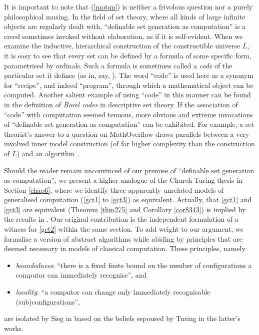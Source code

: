 \documentclass[12pt, twoside]{memoir}
\numberwithin{equation}{section}
\theoremstyle{definition}
\theoremstyle{remark}
\theoremstyle{definition}
\theoremstyle{definition}
\theoremstyle{definition}
\theoremstyle{remark}
\begin{document}
It is important to note that (\ref{motqn}) is neither a frivolous question nor a purely philosophical musing. In the field of set theory, where all kinds of large infinite objects are regularly dealt with, ``definable set generation as computation'' is a creed sometimes invoked without elaboration, as if it is self-evident. When we examine the inductive, hierarchical construction of the constructible universe $L$, it is easy to see that every set can be defined by a formula of some specific form, parametrised by ordinals. Such a formula is sometimes called a \textit{code} of the particular set it defines (as in, say, \cite{koepke1}). The word ``code'' is used here as a synonym for ``recipe'', and indeed ``program'', through which a mathematical object can be computed. Another salient example of using ``code'' in this manner can be found in the definition of \textit{Borel codes} in descriptive set theory. If the association of ``code'' with computation seemed tenuous, more obvious and extreme invocations of ``definable set generation as computation'' can be exhibited. For example, a set theorist's answer to a question on MathOverflow draws parallels between a very involved inner model construction (of far higher complexity than the construction of $L$) and an algorithm \cite{grigor}.

Should the reader remain unconvinced of our premise of ``definable set generation as computation'', we present a higher analogue of the Church-Turing thesis in Section \ref{chap6}, where we identify three apparently unrelated models of generalised computation (\ref{gct1} to \ref{gct3}) as equivalent. Actually, that \ref{gct1} and \ref{gct3} are equivalent (Theorem \ref{thm275} and Corollary \ref{cor8343}) is implied by the results in \cite{koepke1}. Our original contribution is the independent formulation of a witness for \ref{gct2} within the same section. To add weight to our argument, we formalise a version of abstract algorithms while abiding by principles that are deemed necessary in models of classical computation. These principles, namely
\begin{itemize}
    \item \textit{boundedness}: ``there is a fixed finite bound on the number of configurations a computor can immediately recognise'', and
    \item \textit{locality}: ``a computor can change only immediately recognisable (sub)configurations'',
\end{itemize}
are isolated by Sieg in \cite{sieg} based on the beliefs espoused by Turing in the latter's works.
\end{document}
